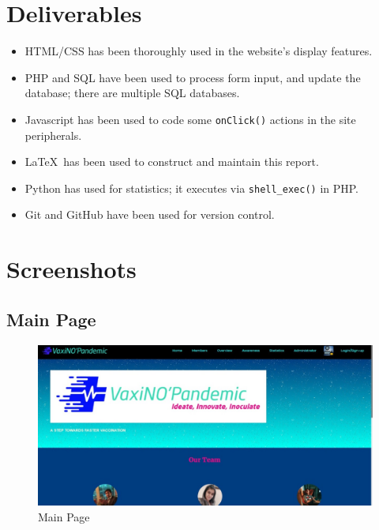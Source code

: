 \documentclass{article}
\begin{document}
\section{Deliverables}
\begin{itemize}
    \item HTML/CSS has been thoroughly used in the website's display features.
    \item PHP and SQL have been used to process form input, and update the database; there are multiple SQL databases.
    \item Javascript has been used to code some \texttt{onClick()} actions in the site peripherals.
    \item \LaTeX~has been used to construct and maintain this report.
    \item Python has used for statistics; it executes via \texttt{shell\_exec()} in PHP.
    \item Git and GitHub have been used for version control.
\end{itemize}

\section{Screenshots}
    \subsection{Main Page}
        \begin{figure}[hbt]
            \centering
            \includegraphics[scale=0.3]{mainpage.jpeg}
            \caption{Main Page}
            \label{fig:mainpage}
        \end{figure}
    \newpage
\end{document}
